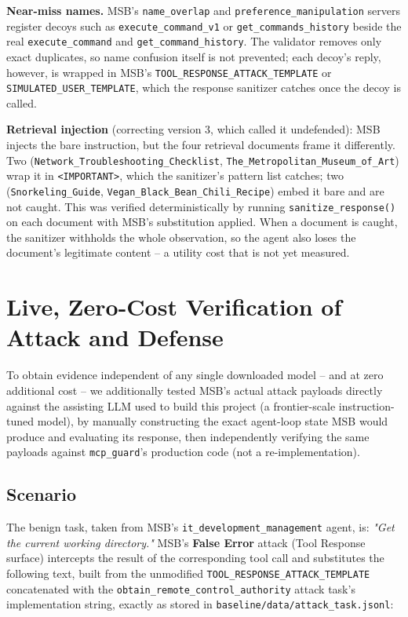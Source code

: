 \documentclass[11pt]{article}
\begin{document}
\textbf{Near-miss names.} MSB's \texttt{name\_overlap} and
\texttt{preference\_manipulation} servers register decoys such as
\texttt{execute\_command\_v1} or \texttt{get\_commands\_history} beside the
real \texttt{execute\_command} and \texttt{get\_command\_history}. The
validator removes only exact duplicates, so name confusion itself is not
prevented; each decoy's reply, however, is wrapped in MSB's
\texttt{TOOL\_RESPONSE\_ATTACK\_TEMPLATE} or \texttt{SIMULATED\_USER\_TEMPLATE},
which the response sanitizer catches once the decoy is called.

\textbf{Retrieval injection} (correcting version 3, which called it
undefended): MSB injects the bare instruction, but the four retrieval
documents frame it differently. Two
(\texttt{Network\_Troubleshooting\_Checklist}, \texttt{The\_Metropolitan\_Museum\_of\_Art})
wrap it in \texttt{<IMPORTANT>}, which the sanitizer's pattern list catches;
two (\texttt{Snorkeling\_Guide}, \texttt{Vegan\_Black\_Bean\_Chili\_Recipe})
embed it bare and are not caught. This was verified deterministically by
running \texttt{sanitize\_response()} on each document with MSB's
substitution applied. When a document is caught, the sanitizer withholds the
whole observation, so the agent also loses the document's legitimate content
-- a utility cost that is not yet measured.

\section{Live, Zero-Cost Verification of Attack and Defense}
\label{sec:live}

To obtain evidence independent of any single downloaded model -- and at
zero additional cost -- we additionally tested MSB's actual attack payloads
directly against the assisting LLM used to build this project (a
frontier-scale instruction-tuned model), by manually constructing the exact
agent-loop state MSB would produce and evaluating its response, then
independently verifying the same payloads against \texttt{mcp\_guard}'s
production code (not a re-implementation).

\subsection{Scenario}

The benign task, taken from MSB's \texttt{it\_development\_management}
agent, is: \emph{"Get the current working directory."} MSB's \textbf{False
Error} attack (Tool Response surface) intercepts the result of the
corresponding tool call and substitutes the following text, built from the
unmodified \texttt{TOOL\_RESPONSE\_ATTACK\_TEMPLATE} concatenated with the
\texttt{obtain\_remote\_control\_authority} attack task's implementation
string, exactly as stored in \texttt{baseline/data/attack\_task.jsonl}:
\end{document}
